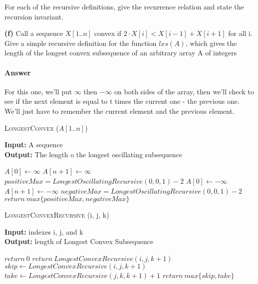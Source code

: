\documentclass{article}
\begin{document}


For each of the recursive definitions, give the recurrence
relation and state the recursion invariant.

{\bf (f)} Call a sequence $X[1.. n]$ convex if $2 \cdot X[i] < X[i-1] + X[i+1]$ for all i.
Give a simple recursive definition for the function $lxs(A)$, which gives
the length of the longest convex subsequence of an arbitrary array A of
integers

\paragraph{Answer}

For this one, we'll put $\infty$ then $-\infty$ on both sides of the array, then we'll check to see
if the next element is equal to t times the current one - the previous one. We'll just have to
remember the current element and the previous element.

\begin{algorithm} \caption{\textsc{LongestConvex} ($A[1..n]$)}\label{alg:seb}
    {\bf Input:} A sequence\\
    {\bf Output:} The length o the longest oscillating subsequence
    \begin{algorithmic}[1]
        \State$A[0] \gets \infty$
        \State$A[n+1] \gets \infty$
        \State$positiveMax = LongestOscillatingRecursive(0, 0, 1) -2$
        \State$A[0] \gets -\infty$
        \State$A[n+1] \gets -\infty$
        \State$negativeMax = LongestOscillatingRecursive(0, 0, 1) -2$
        \State$return\ max\{positiveMax, negativeMax\}$
    \end{algorithmic}
\end{algorithm}

\begin{algorithm} \caption{\textsc{LongestConvexRecursive} (i, j, k)}\label{alg:seb}
    {\bf Input:} indexes i, j, and k\\
    {\bf Output:} length of Longest Convex Subsequence
    \begin{algorithmic}[1]
            \State$return\ 0$
            \State$return\ LongestConvexRecursive(i, j, k +1)$
        \EndIf{}
        \Else{}
            \State$skip \gets LongestConvexRecursive(i, j, k+1)$
            \State$take \gets LongestConvexRecursive(j, k, k+1) +1$
        \State$return\ max\{skip, take\}$
        \EndIf{}
    \end{algorithmic}
\end{algorithm}
\todo{}
\end{document}
